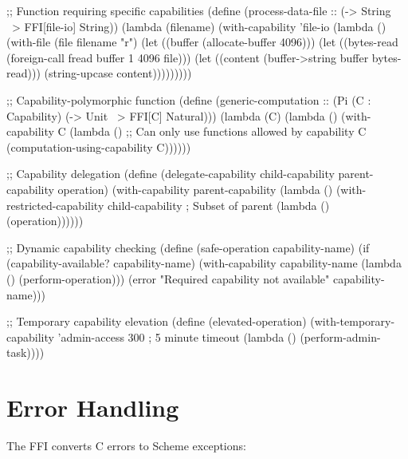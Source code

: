 \begin{example}
\begin{lambdustcode}
;; Function requiring specific capabilities
(define (process-data-file :: (-> String ~> {FFI[file-io]} String))
  (lambda (filename)
    (with-capability 'file-io
      (lambda ()
        (with-file (file filename "r")
          (let ((buffer (allocate-buffer 4096)))
            (let ((bytes-read (foreign-call fread buffer 1 4096 file)))
              (let ((content (buffer->string buffer bytes-read)))
                (string-upcase content)))))))))

;; Capability-polymorphic function
(define (generic-computation :: (Pi (C : Capability) (-> Unit ~> {FFI[C]} Natural)))
  (lambda (C)
    (lambda ()
      (with-capability C
        (lambda ()
          ;; Can only use functions allowed by capability C
          (computation-using-capability C))))))

;; Capability delegation
(define (delegate-capability child-capability parent-capability operation)
  (with-capability parent-capability
    (lambda ()
      (with-restricted-capability child-capability  ; Subset of parent
        (lambda ()
          (operation))))))

;; Dynamic capability checking
(define (safe-operation capability-name)
  (if (capability-available? capability-name)
      (with-capability capability-name
        (lambda () (perform-operation)))
      (error "Required capability not available" capability-name)))

;; Temporary capability elevation
(define (elevated-operation)
  (with-temporary-capability 'admin-access 300  ; 5 minute timeout
    (lambda ()
      (perform-admin-task))))
\end{lambdustcode}
\end{example}

\section{Error Handling}
\label{sec:ffi-errors}


The FFI converts C errors to Scheme exceptions:

